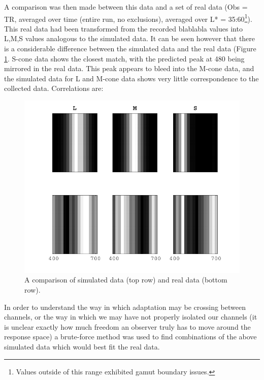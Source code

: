 A comparison was then made between this data and a set of real data (Obs = TR, averaged over time (entire run, no exclusions), averaged over L* = 35:60\footnote{Values outside of this range exhibited gamut boundary issues.}). This real data had been transformed from the recorded blablabla %
values into L,M,S values analogous to the simulated data. It can be seen however that there is a considerable difference between the simulated data and the real data (Figure \ref{fig:simVreal}. S-cone data shows the closest match, with the predicted peak at 480 being mirrored in the real data. This peak appears to bleed into the M-cone data, and the simulated data for L and M-cone data shows very little correspondence to the collected data. Correlations are: %

\begin{figure}[htbp]
\includegraphics[max width=\textwidth]{figs/LargeSphere/simVreal.pdf}
\caption{A comparison of simulated data (top row) and real data (bottom row).}
\label{fig:simVreal}
\end{figure}

In order to understand the way in which adaptation may be crossing between channels, or the way in which we may have not properly isolated our channels (it is unclear exactly how much freedom an observer truly has to move around the response space) a brute-force method was used to find combinations of the above simulated data which would best fit the real data.

